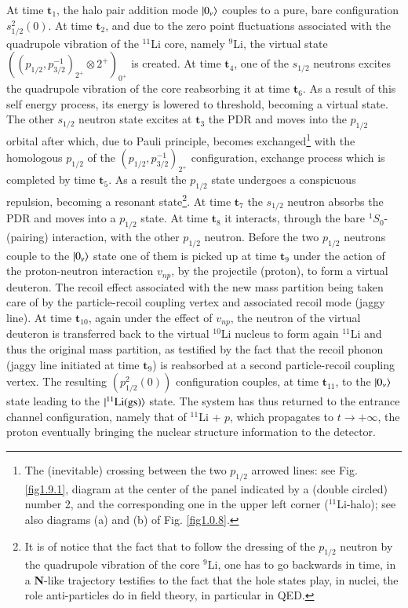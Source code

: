  At time $\mathbf{t}_1$, the halo pair addition mode $|{0_\nu} \rangle$ couples to a pure, bare configuration $s_{1/2}^2(0)$. At time $\mathbf{t}_2$, and due to the zero point fluctuations associated with the quadrupole vibration of the $^{11}$Li core, namely $^9$Li, the virtual state $((p_{1/2},p_{3/2}^{-1})_{2^+}\otimes 2^+)_{0^+}$ is created. At time $\mathbf{t}_4$, one of the  $s_{1/2}$ neutrons excites the quadrupole vibration of the core reabsorbing it at time $\mathbf{t}_6$. As a result of this self energy process, its energy is lowered to threshold, becoming a virtual state. The other $s_{1/2}$  neutron state excites at $\mathbf{t}_3$ the PDR and moves into the $p_{1/2}$ orbital after which,  due to Pauli principle, becomes exchanged\footnote{The (inevitable) crossing between the two $p_{1/2}$ arrowed lines: see Fig. \ref{fig1.9.1},  diagram at the center of the panel indicated by a (double circled) number 2, and the corresponding one in the upper left corner ($^{11}$Li-halo); see also diagrams (a) and (b) of Fig. \ref{fig1.0.8}.} with the homologous $p_{1/2}$ of the $(p_{1/2},p_{3/2}^{-1})_{2^+}$
configuration, exchange process which is completed by time $\mathbf{t}_5$. As a result the $p_{1/2}$ state undergoes a conspicuous repulsion, becoming a resonant state\footnote{It is of notice that the fact that to follow the dressing of the $p_{1/2}$ neutron by the quadrupole vibration of the core $^9$Li, one has to go backwards in time, in a \textbf{N}-like trajectory testifies to the fact that the hole states play, in nuclei, the role  anti-particles do in field theory, in particular in QED. }. At time $\mathbf{t}_7$ the $s_{1/2}$ neutron absorbs the PDR and moves into a $p_{1/2}$ state. At time $\mathbf{t}_8$ it interacts, through the bare $^1S_0$-(pairing) interaction, with the other $p_{1/2}$ neutron. Before the two $p_{1/2}$ neutrons couple to the $|{0_\nu} \rangle$ state one of them is picked up at time $\mathbf{t}_9$ under the action of the proton-neutron interaction $v_{np}$, by the projectile (proton), to form a virtual deuteron. The recoil effect associated with the new mass partition being taken care of by the particle-recoil coupling vertex and associated recoil mode (jaggy line). At time $\mathbf{t}_{10}$, again under the effect of $v_{np}$, the neutron of the virtual deuteron is transferred back to the virtual $^{10}$Li nucleus to form again $^{11}$Li and thus the original mass partition, as testified by the fact that the recoil phonon (jaggy line initiated at time $\mathbf{t}_9$) is reabsorbed at a second particle-recoil coupling vertex. The resulting $(p^2_{1/2}(0))$ configuration couples, at time $\mathbf{t}_{11}$, to the $|{0_\nu} \rangle$ state leading to the $|{^{11}\text{Li(gs)}} \rangle$ state. The system has thus returned to the entrance channel configuration, namely that of $^{11}$Li + $p$, which propagates to $t\to+\infty$, the proton eventually bringing the nuclear structure information to the detector.



